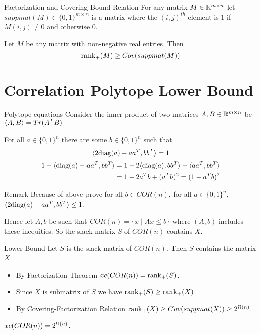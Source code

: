 \documentclass[aspectratio=1610, handout]{beamer}
\begin{document}
\begin{frame}{Factorization and Covering Bound Relation}
	For any matrix $M\in\mathbb{R}^{m\times n}$ let $suppmat(M)\in\{0,1\}^{m\times n}$ is a matrix where the $(i,j)^{th}$ element is $1$ if $M(i,j)\neq 0$ and otherwise $0$.\vspace*{1cm}

	\begin{theorem}
		Let $M$ be any matrix with non-negative real entries. Then $$\operatorname{rank}_+(M)\geq Cov(suppmat(M))$$
	\end{theorem}
\end{frame}
\section{Correlation Polytope Lower Bound}
\begin{frame}{Polytope equations}
	Consider the inner product of two matrices $A,B\in\mathbb{R}^{m\times n}$ be $\langle A,B\rangle=Tr(A^TB)$\pause

	For all $a\in \{0,1\}^n$ there are some $b\in\{0,1\}^n$ such that $$\langle 2\text{diag}(a)-aa^T,bb^T\rangle=1$$ \begin{align*}
		1-\langle \text{diag}(a)-aa^T,bb^T\rangle & = 1-2\langle \text{diag}(a),bb^T\rangle+\langle aa^T,bb^T\rangle\\
		& = 1-2a^Tb+(a^Tb)^2=(1-a^Tb)^2
	\end{align*}\pause%

	\begin{tblock}{Remark}
		Because of above prove for all $b\in COR(n)$, for all $a\in\{0,1\}^n $, $\langle 2\text{diag}(a)-aa^T,bb^T\rangle\leq 1$. 
	\end{tblock}
	Hence let $A,b$ be such that $COR(n)=\{x\mid Ax\leq b\}$ where $(A,b)$ includes these inequities. So the slack matrix $S$ of $COR(n)$ contains $X$.
\end{frame}
\begin{frame}{Lower Bound}
	Let $S$ is the slack matrix of $COR(n)$. Then $S$ contains the matrix $X$. \vspace*{5mm}
	
	\begin{itemize}
		\item By Factorization Theorem $xc(COR(n))=\operatorname{rank}_+(S)$.\pause \vspace*{5mm}
		
		\item Since $X$ is submatrix of $S$ we have $\operatorname{rank}_+(S)\geq \operatorname{rank}_+(X)$.\pause\vspace*{5mm}
		
		
		\item By Covering-Factorization Relation $\operatorname{rank}_+(X)\geq Cov(suppmat(X))\geq 2^{\Omega(n)}$.
	\end{itemize}\vspace*{5mm}
		
	\begin{theorem}
		$xc(COR(n))=2^{\Omega(n)}$.
	\end{theorem}
\end{frame}
\end{document}
